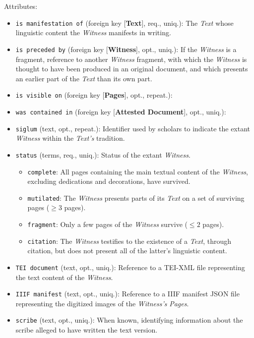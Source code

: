 \vspace{1em}
\noindent Attributes:
\begin{itemize}
    \item \texttt{is manifestation of} (foreign key [\textbf{Text}], req., uniq.): The \textit{Text} whose linguistic content the \textit{Witness} manifests in writing.
    \item \texttt{is preceded by} (foreign key [\textbf{Witness}], opt., uniq.): If the \textit{Witness} is a fragment, reference to another \textit{Witness} fragment, with which the \textit{Witness} is thought to have been produced in an original document, and which presents an earlier part of the \textit{Text} than its own part.
    \item \texttt{is visible on} (foreign key [\textbf{Pages}], opt., repeat.): 
    \item \texttt{was contained in} (foreign key [\textbf{Attested Document}], opt., uniq.): 
    \item \texttt{siglum} (text, opt., repeat.): Identifier used by scholars to indicate the extant \textit{Witness} within the \textit{Text's} tradition.
    \item \texttt{status} (terms, req., uniq.): Status of the extant \textit{Witness}.
    \begin{itemize}
        \item \texttt{complete}: All pages containing the main textual content of the \textit{Witness}, excluding dedications and decorations, have survived.
        \item \texttt{mutilated}: The \textit{Witness} presents parts of its \textit{Text} on a set of surviving pages ($ \geq 3 $ pages).
        \item \texttt{fragment}: Only a few pages of the \textit{Witness} survive ($ \leq 2 $ pages). 
        \item \texttt{citation}: The \textit{Witness} testifies to the existence of a \textit{Text}, through citation, but does not present all of the latter's linguistic content.
    \end{itemize}
    \item \texttt{TEI document} (text, opt., uniq.): Reference to a TEI-XML file representing the text content of the \textit{Witness}.
    \item \texttt{IIIF manifest} (text, opt., uniq.): Reference to a IIIF manifest JSON file representing the digitized images of the \textit{Witness's} \textit{Pages}.
    \item \texttt{scribe} (text, opt., uniq.): When known, identifying information about the scribe alleged to have written the text version.

\end{itemize}
